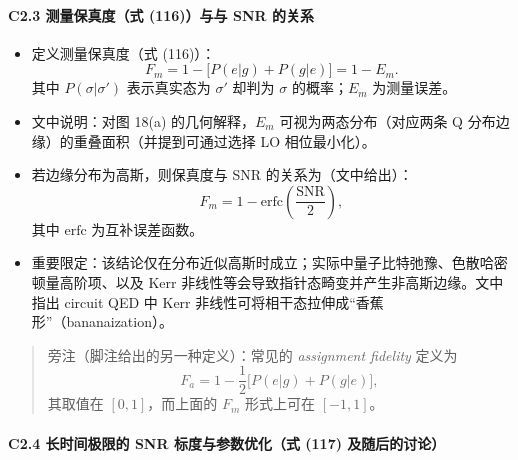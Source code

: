 \documentclass[12pt,a4paper,oneside]{ctexbook}
\providecommand{\tightlist}{%
  \setlength{\itemsep}{0pt}\setlength{\parskip}{0pt}}
\let\oldparagraph\paragraph
\renewcommand{\paragraph}[1]{\oldparagraph{#1}\mbox{}}
\begin{document}
\paragraph{C2.3 测量保真度（式 (116)）与与 SNR
的关系}\label{c2.3-ux6d4bux91cfux4fddux771fux5ea6ux5f0f-116ux4e0eux4e0e-snr-ux7684ux5173ux7cfb}

\begin{itemize}
\tightlist
\item
  定义测量保真度（式 (116)）： \[
  F_m=1-\big[P(e\lvert g)+P(g\lvert e)\big]=1-E_m .
  \] 其中 \(P(\sigma\lvert \sigma')\) 表示真实态为 \(\sigma'\) 却判为
  \(\sigma\) 的概率；\(E_m\) 为测量误差。
\item
  文中说明：对图 18(a) 的几何解释，\(E_m\) 可视为两态分布（对应两条 Q
  分布边缘）的重叠面积（并提到可通过选择 LO 相位最小化）。
\item
  若边缘分布为高斯，则保真度与 SNR 的关系为（文中给出）： \[
  F_m=1-\mathrm{erfc}\!\left(\frac{\mathrm{SNR}}{2}\right),
  \] 其中 \(\mathrm{erfc}\) 为互补误差函数。
\item
  重要限定：该结论仅在分布近似高斯时成立；实际中量子比特弛豫、色散哈密顿量高阶项、以及
  Kerr 非线性等会导致指针态畸变并产生非高斯边缘。文中指出 circuit QED 中
  Kerr 非线性可将相干态拉伸成``香蕉形''（bananaization）。
\end{itemize}

\begin{quote}
旁注（脚注给出的另一种定义）：常见的 \emph{assignment fidelity} 定义为\\
\[
F_a = 1-\frac{1}{2}\big[P(e\lvert g)+P(g\lvert e)\big],
\] 其取值在 \([0,1]\)，而上面的 \(F_m\) 形式上可在 \([-1,1]\)。
\end{quote}

\paragraph{C2.4 长时间极限的 SNR 标度与参数优化（式 (117)
及随后的讨论）}\label{c2.4-ux957fux65f6ux95f4ux6781ux9650ux7684-snr-ux6807ux5ea6ux4e0eux53c2ux6570ux4f18ux5316ux5f0f-117-ux53caux968fux540eux7684ux8ba8ux8bba}
\end{document}

